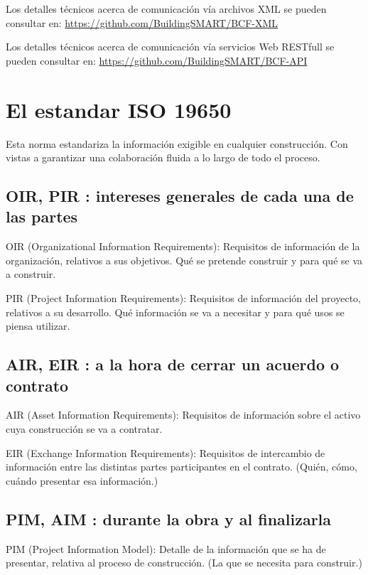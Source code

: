 \documentclass[spanish,12pt,a4paper,final,oneside]{book}
\begin{document}
Los detalles técnicos acerca de comunicación vía archivos XML se pueden consultar en: \url{https://github.com/BuildingSMART/BCF-XML}

Los detalles técnicos acerca de comunicación vía servicios Web RESTfull se pueden consultar en: \url{https://github.com/BuildingSMART/BCF-API}


\section{El estandar ISO 19650} \label{estandarISO19650}

Esta norma estandariza la información exigible en cualquier construcción. Con vistas a garantizar una colaboración fluida a lo largo de todo el proceso.

\subsection{OIR, PIR : intereses generales de cada una de las partes}

OIR (Organizational Information Requirements): Requisitos de información de la organización, relativos a sus objetivos. Qué se pretende construir y para qué se va a construir.

PIR (Project Information Requirements): Requisitos de información del proyecto, relativos a su desarrollo. Qué información se va a necesitar y para qué usos se piensa utilizar.

\subsection{AIR, EIR : a la hora de cerrar un acuerdo o contrato}

AIR (Asset Information Requirements): Requisitos de información sobre el activo cuya construcción se va a contratar.

EIR (Exchange Information Requirements): Requisitos de intercambio de información entre las distintas partes participantes en el contrato. (Quién, cómo, cuándo presentar esa información.)

\subsection{PIM, AIM : durante la obra y al finalizarla}

PIM (Project Information Model): Detalle de la información que se ha de presentar, relativa al proceso de construcción. (La que se necesita para construir.)
\end{document}
